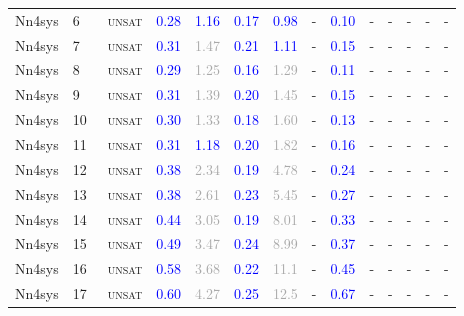 \begin{center}
{\begin{longtable}{@{}llllllllllllll@{}}
Nn4sys & 6 & ~\textsc{unsat} & \textcolor{blue}{0.28} & \textcolor{blue}{1.16} & \textcolor{blue}{0.17} & \textcolor{blue}{0.98} & - & \textcolor{blue}{0.10} & - & - & - & - & - \\
Nn4sys & 7 & ~\textsc{unsat} & \textcolor{blue}{0.31} & \textcolor{darkgray}{1.47} & \textcolor{blue}{0.21} & \textcolor{blue}{1.11} & - & \textcolor{blue}{0.15} & - & - & - & - & - \\
Nn4sys & 8 & ~\textsc{unsat} & \textcolor{blue}{0.29} & \textcolor{darkgray}{1.25} & \textcolor{blue}{0.16} & \textcolor{darkgray}{1.29} & - & \textcolor{blue}{0.11} & - & - & - & - & - \\
Nn4sys & 9 & ~\textsc{unsat} & \textcolor{blue}{0.31} & \textcolor{darkgray}{1.39} & \textcolor{blue}{0.20} & \textcolor{darkgray}{1.45} & - & \textcolor{blue}{0.15} & - & - & - & - & - \\
Nn4sys & 10 & ~\textsc{unsat} & \textcolor{blue}{0.30} & \textcolor{darkgray}{1.33} & \textcolor{blue}{0.18} & \textcolor{darkgray}{1.60} & - & \textcolor{blue}{0.13} & - & - & - & - & - \\
Nn4sys & 11 & ~\textsc{unsat} & \textcolor{blue}{0.31} & \textcolor{blue}{1.18} & \textcolor{blue}{0.20} & \textcolor{darkgray}{1.82} & - & \textcolor{blue}{0.16} & - & - & - & - & - \\
Nn4sys & 12 & ~\textsc{unsat} & \textcolor{blue}{0.38} & \textcolor{darkgray}{2.34} & \textcolor{blue}{0.19} & \textcolor{darkgray}{4.78} & - & \textcolor{blue}{0.24} & - & - & - & - & - \\
Nn4sys & 13 & ~\textsc{unsat} & \textcolor{blue}{0.38} & \textcolor{darkgray}{2.61} & \textcolor{blue}{0.23} & \textcolor{darkgray}{5.45} & - & \textcolor{blue}{0.27} & - & - & - & - & - \\
Nn4sys & 14 & ~\textsc{unsat} & \textcolor{blue}{0.44} & \textcolor{darkgray}{3.05} & \textcolor{blue}{0.19} & \textcolor{darkgray}{8.01} & - & \textcolor{blue}{0.33} & - & - & - & - & - \\
Nn4sys & 15 & ~\textsc{unsat} & \textcolor{blue}{0.49} & \textcolor{darkgray}{3.47} & \textcolor{blue}{0.24} & \textcolor{darkgray}{8.99} & - & \textcolor{blue}{0.37} & - & - & - & - & - \\
Nn4sys & 16 & ~\textsc{unsat} & \textcolor{blue}{0.58} & \textcolor{darkgray}{3.68} & \textcolor{blue}{0.22} & \textcolor{darkgray}{11.1} & - & \textcolor{blue}{0.45} & - & - & - & - & - \\
Nn4sys & 17 & ~\textsc{unsat} & \textcolor{blue}{0.60} & \textcolor{darkgray}{4.27} & \textcolor{blue}{0.25} & \textcolor{darkgray}{12.5} & - & \textcolor{blue}{0.67} & - & - & - & - & - \\

\end{longtable}}
\end{center}
